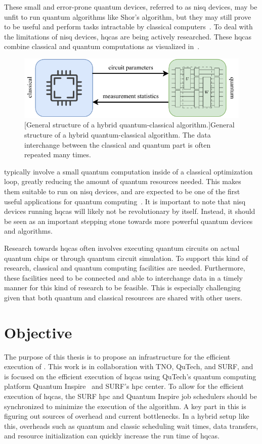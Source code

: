These small and error-prone quantum devices, referred to as \gls{nisq} devices, may be unfit to run quantum algorithms like Shor's algorithm, but they may still prove to be useful and perform tasks intractable by classical computers~\cite{preskill2018quantum}.
To deal with the limitations of \gls{nisq} devices, \glspl{hqca} are being actively researched.
These \glspl{hqca} combine classical and quantum computations as visualized in~.
\begin{figure}[ht]
    \centering
    \includegraphics[width=0.65\linewidth]{figures/hybrid-quantum-algorithm.pdf}
    [General structure of a hybrid quantum-classical algorithm.]{General structure of a hybrid quantum-classical algorithm. The data interchange between the classical and quantum part is often repeated many times.}
    \label{fig:hybrid-quantum-classical}
\end{figure}
 typically involve a small quantum computation inside of a classical optimization loop, greatly reducing the amount of quantum resources needed.
This makes them suitable to run on \gls{nisq} devices, and are expected to be one of the first useful applications for quantum computing~\cite{endo2021hybrid}.
It is important to note that \gls{nisq} devices running \glspl{hqca} will likely not be revolutionary by itself.
Instead, it should be seen as an important stepping stone towards more powerful quantum devices and algorithms.

Research towards \glspl{hqca} often involves executing quantum circuits on actual quantum chips or through quantum circuit simulation.
To support this kind of research, classical and quantum computing facilities are needed.
Furthermore, these facilities need to be connected and able to interchange data in a timely manner for this kind of research to be feasible.
This is especially challenging given that both quantum and classical resources are shared with other users.


\section{Objective}
The purpose of this thesis is to propose an infrastructure for the efficient execution of .
This work is in collaboration with TNO, QuTech, and SURF, and is focused on the efficient execution of \glspl{hqca} using QuTech's quantum computing platform Quantum Inspire~\cite{last2020quantum} and SURF's \gls{hpc} center.
To allow for the efficient execution of \glspl{hqca}, the SURF \gls{hpc} and Quantum Inspire job schedulers should be synchronized to minimize the execution of the algorithm.
A key part in this is figuring out sources of overhead and current bottlenecks.
In a hybrid setup like this, overheads such as quantum and classic scheduling wait times, data transfers, and resource initialization can quickly increase the run time of \glspl{hqca}.

